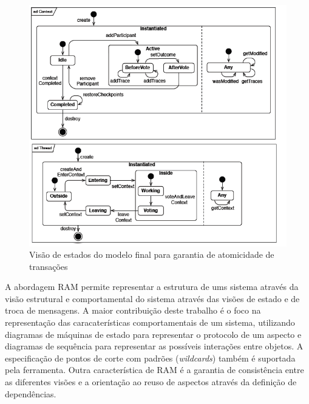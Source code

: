 \begin{landscape}
\begin{figure}
	\centering
	\includegraphics[scale=0.7]{img/p87_state_final_model.png}
	\caption{Visão de estados do modelo final para garantia de atomicidade de transações}\label{fig:p87_state_final_model}
\end{figure}
\end{landscape}

A abordagem RAM permite representar a estrutura de ums sistema através da visão estrutural e comportamental do sistema através das visões de estado
e de troca de mensagens. A maior contribuição deste trabalho é o foco na representação das caracaterísticas comportamentais de um sistema, utilizando
diagramas de máquinas de estado para representar o protocolo de um aspecto e diagramas de sequência para representar as possíveis interações entre
objetos. A especificação de pontos de corte com padrões (\textit{wildcards}) também é suportada pela ferramenta. Outra característica de RAM é a garantia de consistência entre as
diferentes visões e a orientação ao reuso de aspectos através da definição de dependências. 

